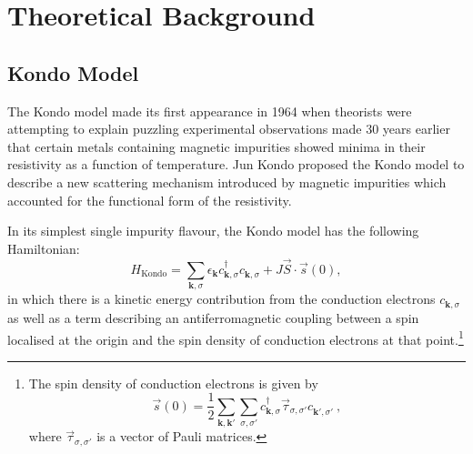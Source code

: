 
\section{Theoretical Background} %
\label{sec:theory}

\subsection{Kondo Model}

The Kondo model made its first appearance in 1964 when theorists were attempting to explain puzzling experimental observations made 30 years earlier that certain metals containing magnetic impurities showed minima in their resistivity as a function of temperature. Jun Kondo proposed the Kondo model to describe a new scattering mechanism introduced by magnetic impurities which accounted for the functional form of the resistivity.

In its simplest single impurity flavour, the Kondo model has the following Hamiltonian: \begin{equation} H_{\text{Kondo}}=\sum_{\boldsymbol{k},\sigma}\epsilon_{\boldsymbol{k}} c_{\boldsymbol{k},\sigma}^{\dagger}c^{}_{\boldsymbol{k},\sigma}+J\vec{S}\cdot\vec{s}(0) , \label{eq:KondoHamiltonian}\end{equation} in which there is a kinetic energy contribution from the conduction electrons $ c^{}_{\boldsymbol{k}, \sigma}$ as well as a term describing an antiferromagnetic coupling between a spin localised at the origin and the spin density of conduction electrons at that point.\footnote{The spin density of conduction electrons is given by $$ \vec{s}(0) = \frac{1}{2} \sum_{\boldsymbol{k}, \boldsymbol{k'}} \sum_{\sigma, \sigma'} c^{\dagger}_{\boldsymbol{k}, \sigma} \vec{\tau}_{\sigma, \sigma'} c^{}_{\boldsymbol{k'}, \sigma'} ~, $$ where $ \vec{\tau}_{\sigma, \sigma'} $ is a vector of Pauli matrices.}




